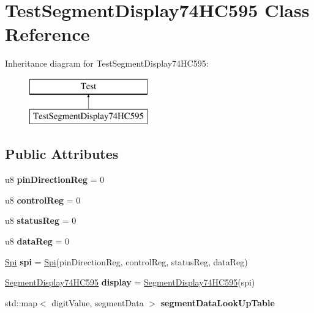 \hypertarget{class_test_segment_display74_h_c595}{}\section{Test\+Segment\+Display74\+H\+C595 Class Reference}
\label{class_test_segment_display74_h_c595}
Inheritance diagram for Test\+Segment\+Display74\+H\+C595\+:\begin{figure}[H]
\begin{center}
\leavevmode
\includegraphics[height=2.000000cm]{class_test_segment_display74_h_c595}
\end{center}
\end{figure}
\subsection*{Public Attributes}
\begin{DoxyCompactItemize}
\item 
\mbox{\label{class_test_segment_display74_h_c595_af2798ef4f77230c853c944bc049a6082}} 
u8 {\bfseries pin\+Direction\+Reg} = 0
\item 
\mbox{\label{class_test_segment_display74_h_c595_aa81517db050dcb1bfc54c5ccce0de0fa}} 
u8 {\bfseries control\+Reg} = 0
\item 
\mbox{\label{class_test_segment_display74_h_c595_a59e27e6533a5dade8460c3acd1c2a4bc}} 
u8 {\bfseries status\+Reg} = 0
\item 
\mbox{\label{class_test_segment_display74_h_c595_a343a03e0831f6efcdeb675dceb1949ff}} 
u8 {\bfseries data\+Reg} = 0
\item 
\mbox{\label{class_test_segment_display74_h_c595_ab093597d558c95849a23fce5886fadea}} 
\mbox{\hyperlink{class_spi}{Spi}} {\bfseries spi} = \mbox{\hyperlink{class_spi}{Spi}}(pin\+Direction\+Reg, control\+Reg, status\+Reg, data\+Reg)
\item 
\mbox{\label{class_test_segment_display74_h_c595_aaa666829ff3f82cf4d8ec37a97cdf13b}} 
\mbox{\hyperlink{class_segment_display74_h_c595}{Segment\+Display74\+H\+C595}} {\bfseries display} = \mbox{\hyperlink{class_segment_display74_h_c595}{Segment\+Display74\+H\+C595}}(spi)
\item 
std\+::map$<$ digit\+Value, segment\+Data $>$ {\bfseries segment\+Data\+Look\+Up\+Table}
\end{DoxyCompactItemize}


